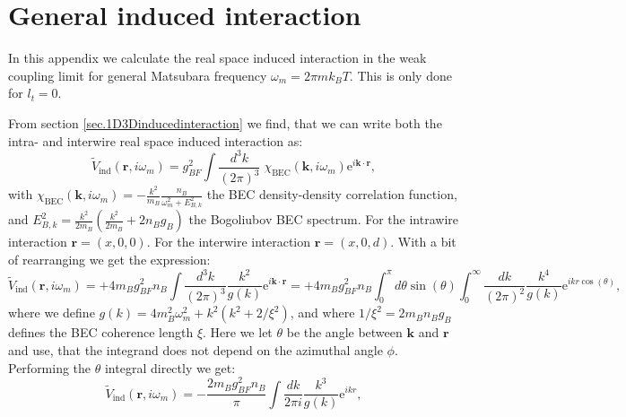 
\chapter{General induced interaction} %

\label{Appendix.inducedinteraction.realspace} %
\chead{}
In this appendix we calculate the real space induced interaction in the weak coupling limit for general Matsubara frequency $\omega_m = 2\pi m k_B T$. This is only done for $l_t = 0$. 

From section \ref{sec.1D3Dinducedinteraction} we find, that we can write both the intra- and interwire real space induced interaction as:
\begin{equation}
\tilde{V}_{\text{ind}}(\mathbf{r}, i\omega_m) = g_{BF}^2\int\frac{d^3k}{(2\pi)^3}\; \chi_\text{BEC}(\mathbf{k}, i\omega_m)\text{e}^{i\mathbf{k}\cdot \mathbf{r}}, 
\label{eq.limitVindxomegam}
\end{equation}
with $\chi_\text{BEC}(\mathbf{k}, i\omega_m) = -\frac{k^2}{m_B}\frac{n_B}{\omega^2_m + E_{B,k}^2}$ the BEC density-density correlation function, and $E^2_{B,k} = \frac{k^2}{2m_B}\left(\frac{k^2}{2m_B} + 2n_Bg_B\right)$ the Bogoliubov BEC spectrum. For the intrawire interaction $\mathbf{r} = (x, 0, 0)$. For the interwire interaction $\mathbf{r} = (x, 0, d)$. With a bit of rearranging we get the expression:
\begin{equation}
\tilde{V}_{\text{ind}}(\mathbf{r}, i\omega_m) = +4m_Bg^2_{BF}n_B\int \frac{d^3k}{(2\pi)^3} \frac{k^2}{g(k)}\text{e}^{i\mathbf{k}\cdot\mathbf{r}} = +4m_Bg^2_{BF}n_B\int_0^\pi d\theta \sin(\theta)\int_0^{\infty} \frac{dk}{(2\pi)^2} \frac{k^4}{g(k)}\text{e}^{ikr\cos(\theta)}, \nonumber
\end{equation}
where we define $g(k) = 4m_B^2\omega^2_m + k^2(k^2 + 2/\xi^2)$, and where $1/\xi^2 = 2m_Bn_Bg_B$ defines the BEC coherence length $\xi$. Here we let $\theta$ be the angle between $\mathbf{k}$ and $\mathbf{r}$ and use, that the integrand does not depend on the azimuthal angle $\phi$. Performing the $\theta$ integral directly we get:
\begin{equation}
\tilde{V}_{\text{ind}}(\mathbf{r}, i\omega_m) = -\frac{2m_Bg^2_{BF}n_B}{\pi}\int \frac{dk}{2\pi i} \frac{k^3}{g(k)}\text{e}^{ikr}, \nonumber
\end{equation}

